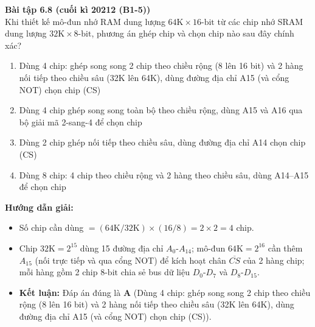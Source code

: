 \textbf{Bài tập 6.8 (cuối kì 20212 (B1-5))}\\
Khi thiết kế mô-đun nhớ RAM dung lượng $64\text{K} \times 16\text{-bit}$ từ các chip nhớ SRAM dung lượng $32\text{K} \times 8\text{-bit}$, phương án ghép chip và chọn chip nào sau đây chính xác?
\begin{enumerate}[label=\Alph*.]
    \item Dùng 4 chip: ghép song song 2 chip theo chiều rộng (8 lên 16 bit) và 2 hàng nối tiếp theo chiều sâu (32K lên 64K), dùng đường địa chỉ A15 (và cổng NOT) chọn chip (CS)
    \item Dùng 4 chip ghép song song toàn bộ theo chiều rộng, dùng A15 và A16 qua bộ giải mã 2-sang-4 để chọn chip
    \item Dùng 2 chip ghép nối tiếp theo chiều sâu, dùng đường địa chỉ A14 chọn chip (CS)
    \item Dùng 8 chip: 4 chip theo chiều rộng và 2 hàng theo chiều sâu, dùng A14--A15 để chọn chip
\end{enumerate}
\textbf{Hướng dẫn giải:}
\begin{itemize}
    \item Số chip cần dùng $= (64\text{K}/32\text{K}) \times (16/8) = 2 \times 2 = 4$ chip.
    \item Chip $32\text{K} = 2^{15}$ dùng 15 đường địa chỉ $A_0\text{-}A_{14}$; mô-đun $64\text{K} = 2^{16}$ cần thêm $A_{15}$ (nối trực tiếp và qua cổng NOT) để kích hoạt chân $\overline{CS}$ của 2 hàng chip; mỗi hàng gồm 2 chip $8\text{-bit}$ chia sẻ bus dữ liệu $D_0\text{-}D_7$ và $D_8\text{-}D_{15}$.
    \item \textbf{Kết luận:} Đáp án đúng là \textbf{A} (Dùng 4 chip: ghép song song 2 chip theo chiều rộng (8 lên 16 bit) và 2 hàng nối tiếp theo chiều sâu (32K lên 64K), dùng đường địa chỉ A15 (và cổng NOT) chọn chip (CS)).
\end{itemize}

